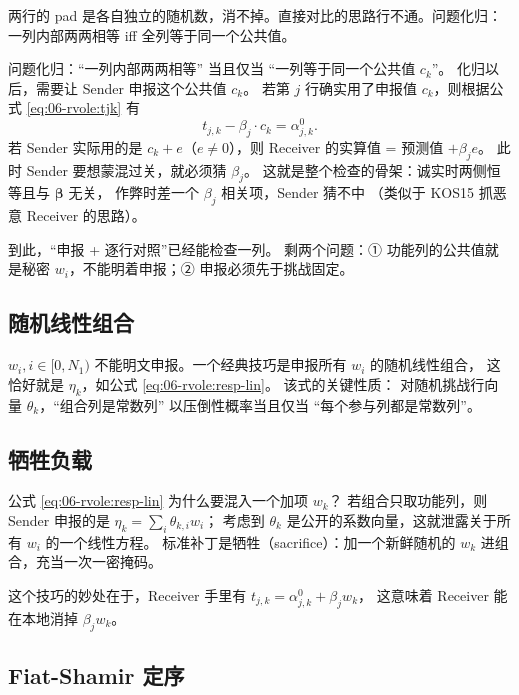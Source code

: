 两行的 pad 是各自独立的随机数，消不掉。直接对比的思路行不通。问题化归：
一列内部两两相等 iff 全列等于同一个公共值。

问题化归：“一列内部两两相等” 当且仅当 “一列等于同一个公共值 $c_k$”。
化归以后，需要让 Sender 申报这个公共值 $c_k$。
若第 $j$ 行确实用了申报值 $c_k$，则根据公式 \eqref{eq:06-rvole:tjk} 有
\begin{equation}
  t_{j,k} - \beta_j \cdot c_k = \alpha^0_{j,k}.
\end{equation}
若 Sender 实际用的是 $c_k + e$（$e \neq 0$），则 Receiver 的实算值 = 预测值 $+ \beta_j e$。
此时 Sender 要想蒙混过关，就必须猜 $\beta_j$。
这就是整个检查的骨架：诚实时两侧恒等且与 $\boldsymbol\beta$ 无关，
作弊时差一个 $\beta_j$ 相关项，Sender 猜不中
（类似于 KOS15 抓恶意 Receiver 的思路）。

到此，“申报 + 逐行对照”已经能检查一列。
剩两个问题：① 功能列的公共值就是秘密 $w_i$，不能明着申报；② 申报必须先于挑战固定。

\subsection{随机线性组合}

$w_i, i\in[0,N_1)$ 不能明文申报。一个经典技巧是申报所有 $w_i$ 的随机线性组合，
这恰好就是 $\eta_k$，如公式 \eqref{eq:06-rvole:resp-lin}。
该式的关键性质：
对随机挑战行向量 $\theta_k$，“组合列是常数列” 以压倒性概率当且仅当 “每个参与列都是常数列”。

\subsection{牺牲负载}

公式 \eqref{eq:06-rvole:resp-lin} 为什么要混入一个加项 $w_k$？
若组合只取功能列，则 Sender 申报的是 $\eta_k = \sum_i \theta_{k,i} w_i$；
考虑到 $\theta_k$ 是公开的系数向量，这就泄露关于所有 $w_i$ 的一个线性方程。
标准补丁是牺牲（sacrifice）：加一个新鲜随机的 $w_k$ 进组合，充当一次一密掩码。

这个技巧的妙处在于，Receiver 手里有 $t_{j,k} = \alpha^0_{j,k} + \beta_j w_k$，
这意味着 Receiver 能在本地消掉 $\beta_j w_k$。

\subsection{Fiat-Shamir 定序}

